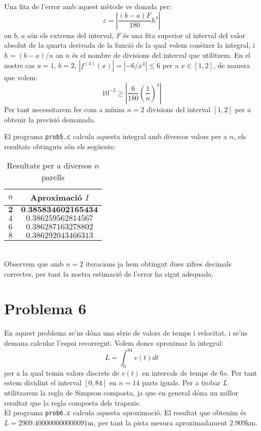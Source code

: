 \documentclass[12pt]{article}
\begin{document}
	Una fita de l'error amb aquest mètode ve donada per:
	$$\varepsilon=\left|\dfrac{(b-a)F}{180}h^4 \right| $$
	on $b$, $a$ són els extrems del interval, $F$ és una fita superior al interval del valor absolut de la quarta derivada de la funció de la qual volem conèixer la integral, i $h=(b-a)/n$ on $n$ és el nombre de divisions del interval que utilitzem. En el nostre cas $a=1$, $b=2$, $|f^{(4)}(x)|=|-6/x^4|\leq6$ per a $x\in[1,2]$, de manera que volem:
	$$10^{-2}\geq\left| \frac{6}{180}\left( \dfrac{1}{n}\right)^4 \right| $$
	Per tant necessitarem fer com a mínim $n=2$ divisions del interval $[1,2]$ per a obtenir la precisió demanada.
	
	El programa \texttt{prob5.c} calcula aquesta integral amb diversos valors per a $n$, els resultats obtinguts són els següents:
	\begin{table}[h!]
		\centering
		\caption{Resultats per a diversos $n$ parells}	
		\begin{tabular}{c|c}
			$n$ & Aproximació $I$\\
			\hline
			\hline
			$\textbf{2}$ & $\textbf{0.385834602165434}$  \\
			$4$ & $0.386259562814567$ \\
			$6$ & $0.386287163278802$ \\
			$8$ & $0.386292043466313$ \\
		\end{tabular}
	\end{table}\\
	Observem que amb $n=2$ iteracions ja hem obtingut dues xifres decimals correctes, per tant la nostra estimació de l'error ha sigut adequada.
	
	\newpage
	\section*{Problema 6}
	En aquest problema se'ns dóna una sèrie de valors de temps i velocitat, i se'ns demana calcular l'espai recorregut. Volem doncs aproximar la integral:
	$$L=\int_{0}^{84}v(t)dt$$
	per a la qual temin valors discrets de $v(t)$ en intervals de temps de $6s$. Per tant estem dividint el interval $[0,84]$ en $n=14$ parts iguals. Per a trobar $L$ utilitzarem la regla de Simpson composta, ja que en general dóna un millor resultat que la regla composta dels trapezis. \\
	
	El programa \texttt{prob6.c} calcula aquesta aproximació. El resultat que obtenim és $L=2909.400000000000091$m, per tant la pista mesura aproximadament $2.909$km.
\end{document}
